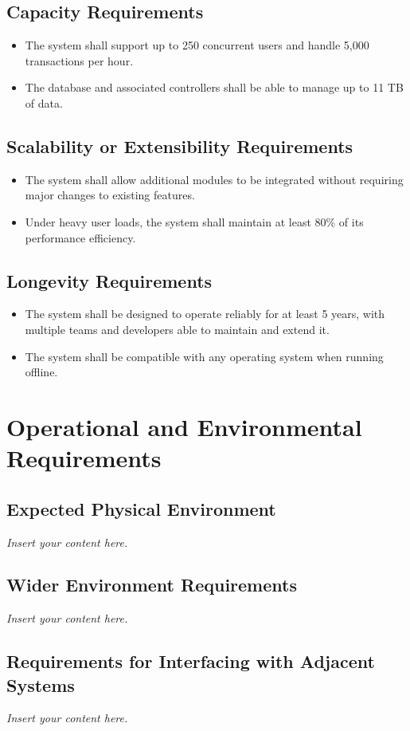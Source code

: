 \documentclass[12pt]{article}
\newcommand{\lips}{\textit{Insert your content here.}}
\begin{document}
\subsection{Capacity Requirements}
\begin{itemize}
    \item The system shall support up to 250 concurrent users and handle 5,000 transactions per hour.
    \item The database and associated controllers shall be able to manage up to 11 TB of data.
\end{itemize}

\subsection{Scalability or Extensibility Requirements}
\begin{itemize}
    \item The system shall allow additional modules to be integrated without requiring major changes to existing features.
    \item Under heavy user loads, the system shall maintain at least 80\% of its performance efficiency.
\end{itemize}

\subsection{Longevity Requirements}
\begin{itemize}
    \item The system shall be designed to operate reliably for at least 5 years, with multiple teams and developers able to maintain and extend it.
    \item The system shall be compatible with any operating system when running offline.
\end{itemize}


\section{Operational and Environmental Requirements}
\subsection{Expected Physical Environment}
\lips
\subsection{Wider Environment Requirements}
\lips
\subsection{Requirements for Interfacing with Adjacent Systems}
\lips
\end{document}
